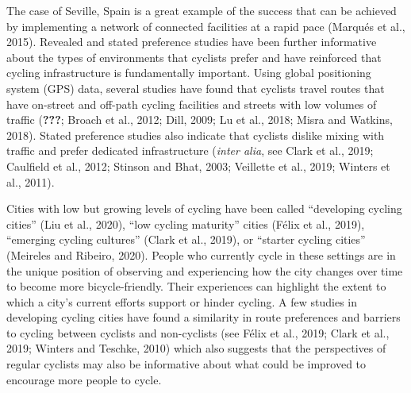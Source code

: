 \documentclass[]{elsarticle} %
\begin{document}
The case of Seville, Spain is a great example of the success that can be
achieved by implementing a network of connected facilities at a rapid
pace (Marqués et al., 2015). Revealed and stated preference studies have
been further informative about the types of environments that cyclists
prefer and have reinforced that cycling infrastructure is fundamentally
important. Using global positioning system (GPS) data, several studies
have found that cyclists travel routes that have on-street and off-path
cycling facilities and streets with low volumes of traffic
({\textbf{???}}; Broach et al., 2012; Dill, 2009; Lu et al., 2018; Misra
and Watkins, 2018). Stated preference studies also indicate that
cyclists dislike mixing with traffic and prefer dedicated infrastructure
(\emph{inter alia}, see Clark et al., 2019; Caulfield et al., 2012;
Stinson and Bhat, 2003; Veillette et al., 2019; Winters et al., 2011).

Cities with low but growing levels of cycling have been called
``developing cycling cities'' (Liu et al., 2020), ``low cycling
maturity'' cities (Félix et al., 2019), ``emerging cycling cultures''
(Clark et al., 2019), or ``starter cycling cities'' (Meireles and
Ribeiro, 2020). People who currently cycle in these settings are in the
unique position of observing and experiencing how the city changes over
time to become more bicycle-friendly. Their experiences can highlight
the extent to which a city's current efforts support or hinder cycling.
A few studies in developing cycling cities have found a similarity in
route preferences and barriers to cycling between cyclists and
non-cyclists (see Félix et al., 2019; Clark et al., 2019; Winters and
Teschke, 2010) which also suggests that the perspectives of regular
cyclists may also be informative about what could be improved to
encourage more people to cycle.
\end{document}

